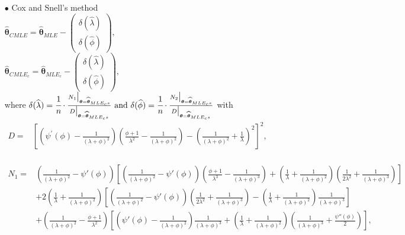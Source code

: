\begin{itemize}
	\item[$\bullet$] Cox and Snell's method \\
	$\widehat{\boldsymbol\theta}_{CMLE}=\widehat{\boldsymbol{\theta}}_{M L E}-\left(\begin{array}{c}
	\delta(\widehat{\lambda}) \\
	\delta(\widehat{\phi})
	\end{array}\right),$ \\
	$\widehat{\boldsymbol\theta}_{CMLE_{c}}=\widehat{\boldsymbol{\theta}}_{M L E_{c}}-\left(\begin{array}{c}
	\delta(\widehat{\lambda}) \\
	\delta(\widehat{\phi})
	\end{array}\right),$ \\
	where
	$\delta(\widehat{\lambda}) =  \cfrac{1}{n}\cdot \frac{ N_{1} \big\rvert_{\boldsymbol\theta=\widehat{\boldsymbol\theta}_{MLE_{c}s}}}{D \big\rvert_{\boldsymbol\theta=\widehat{\boldsymbol\theta}_{MLE_{c}s}}} ~\text{and}~
	\delta(\widehat{\phi}) = \cfrac{1}{n}\cdot \frac{ N_{2} \big\rvert_{\boldsymbol\theta=\widehat{\boldsymbol\theta}_{MLE_{c}s}} }{D \big\rvert_{\boldsymbol\theta=\widehat{\boldsymbol\theta}_{MLE_{c}s}}}$ 
	with\\
	$\begin{aligned}
	D =& \left[ \left( \psi^{\prime} (\phi) - \frac{1}{(\lambda+ \phi)^2} \right)  \left( \frac{\phi+1}{\lambda^2} - \frac{1}{(\lambda+\phi)^2}  \right) - \left( \frac{1}{(\lambda+\phi)^2} + \frac{1}{\lambda}  \right)^2 \right]^2,\\
	\end{aligned}$
	
	$\begin{aligned}
	N_{1} =& \left( \frac{1}{(\lambda+\phi)^2} - \psi' (\phi)  \right) \left[ \left( \frac{1}{(\lambda+\phi)^2} - \psi' (\phi)  \right) \left(  \frac{\phi + 1}{\lambda^3} - \frac{1}{(\lambda+ \phi)^3} \right) + \left( \frac{1}{\lambda} + \frac{1}{(\lambda + \phi)^2} \right) \left( \frac{1}{2 \lambda^2} + \frac{1}{(\lambda+\phi)^3} \right) \right]\\
	&+ 2 \left( \frac{1}{\lambda} + \frac{1}{(\lambda+\phi)^2} \right) \left[ \left( \frac{1}{(\lambda+\phi)^2} - \psi' (\phi) \right) \left( \frac{1}{2 \lambda^2} + \frac{1}{(\lambda + \phi)^3}   \right)  - \left( \frac{1}{\lambda} + \frac{1}{(\lambda + \phi)^2} \right) \frac{1}{(\lambda + \phi)^3} \right] \\
	&+ \left( \frac{1}{(\lambda + \phi)^2} - \frac{\phi + 1}{\lambda^2} \right) \left[ \left( \psi' (\phi) - \frac{1}{(\lambda+\phi)^2} \right) \frac{1}{(\lambda + \phi)^3} + \left( \frac{1}{\lambda} + \frac{1}{(\lambda + \phi)^2}  \right) \left( \frac{1}{(\lambda + \phi)^3} +\frac{\psi'' (\phi)}{2} \right)  \right],\\
	\end{aligned}$
	

\end{itemize}
